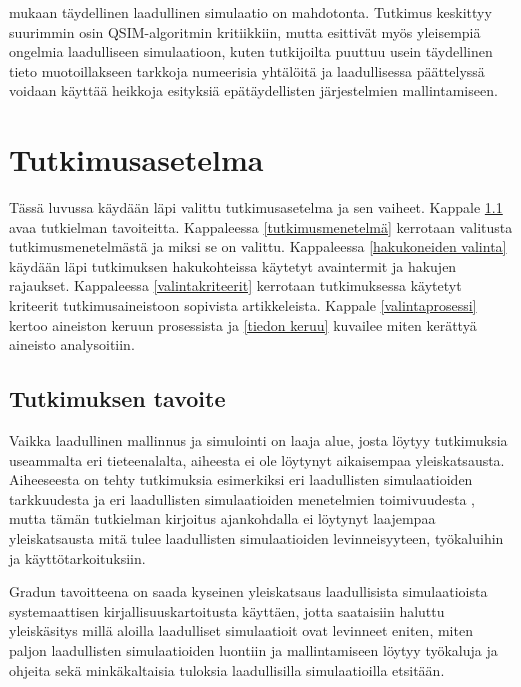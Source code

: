 \documentclass[utf8]{gradu3}
\begin{document}
\textcite{soundQualSimImpossible} mukaan täydellinen laadullinen simulaatio on mahdotonta.
Tutkimus keskittyy suurimmin osin QSIM-algoritmin kritiikkiin, mutta \textcite{soundQualSimImpossible} esittivät myös yleisempiä ongelmia laadulliseen simulaatioon, kuten tutkijoilta puuttuu usein täydellinen tieto muotoillakseen tarkkoja numeerisia yhtälöitä ja laadullisessa päättelyssä voidaan käyttää heikkoja esityksiä epätäydellisten järjestelmien mallintamiseen.

\chapter{Tutkimusasetelma}
Tässä luvussa käydään läpi valittu tutkimusasetelma ja sen vaiheet. 
Kappale \ref{tavoite} avaa tutkielman tavoiteitta.
Kappaleessa \ref{tutkimusmenetelmä} kerrotaan valitusta tutkimusmenetelmästä 
ja miksi se on valittu. Kappaleessa \ref{hakukoneiden valinta} 
käydään läpi tutkimuksen hakukohteissa käytetyt avaintermit ja hakujen rajaukset.
Kappaleessa \ref{valintakriteerit} kerrotaan tutkimuksessa käytetyt kriteerit
tutkimusaineistoon sopivista artikkeleista. 
Kappale \ref{valintaprosessi} kertoo aineiston keruun prosessista ja 
\ref{tiedon keruu} kuvailee miten kerättyä aineisto analysoitiin.

 \section{Tutkimuksen tavoite} \label{tavoite}
Vaikka laadullinen mallinnus ja simulointi on laaja alue, 
josta löytyy tutkimuksia useammalta eri tieteenalalta, 
aiheesta ei ole löytynyt aikaisempaa yleiskatsausta. Aiheeseesta on tehty tutkimuksia esimerkiksi eri laadullisten simulaatioiden tarkkuudesta \parencite{FisherManagmentTechniques2024} ja eri laadullisten simulaatioiden menetelmien toimivuudesta \parencite{qualitativeSimTechniquesAssesment1992}, mutta tämän tutkielman kirjoitus ajankohdalla ei löytynyt laajempaa yleiskatsausta mitä tulee laadullisten simulaatioiden levinneisyyteen, työkaluihin ja käyttötarkoituksiin.  

Gradun tavoitteena on saada kyseinen yleiskatsaus laadullisista simulaatioista systemaattisen kirjallisuuskartoitusta käyttäen, jotta saataisiin haluttu yleiskäsitys millä aloilla laadulliset simulaatioit ovat levinneet eniten, miten paljon laadullisten simulaatioiden luontiin ja mallintamiseen löytyy työkaluja ja ohjeita sekä minkäkaltaisia tuloksia laadullisilla simulaatioilla etsitään.
\end{document}
